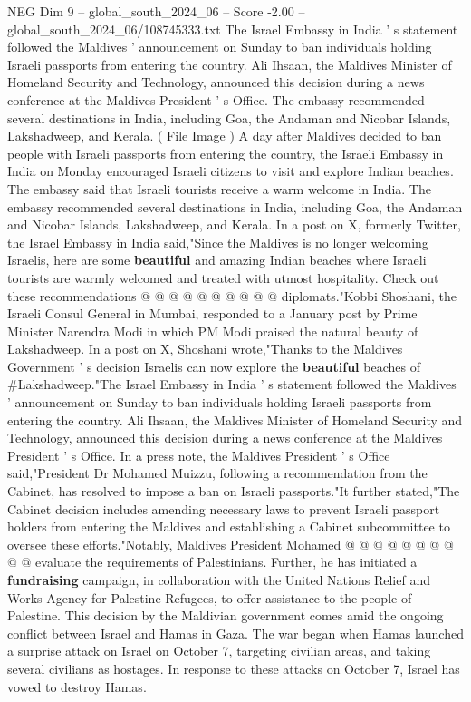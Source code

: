 \begin{textsample}{NEG Dim 9 – global\_south\_2024\_06 – Score -2.00 – global\_south\_2024\_06/108745333.txt}  \label{ex:f9_neg_396}
The Israel Embassy in India ' s statement followed the Maldives ' announcement on Sunday to ban individuals holding Israeli passports from entering the country.
Ali Ihsaan, the Maldives Minister of Homeland Security and Technology, announced this decision during a news conference at the Maldives President ' s Office.
The embassy recommended several destinations in India, including Goa, the Andaman and Nicobar Islands, Lakshadweep, and Kerala. ( File Image ) A day after Maldives decided to ban people with Israeli passports from entering the country, the Israeli Embassy in India on Monday encouraged Israeli citizens to visit and explore Indian beaches.
The embassy said that Israeli tourists receive a warm welcome in India.
The embassy recommended several destinations in India, including Goa, the Andaman and Nicobar Islands, Lakshadweep, and Kerala.
In a post on X, formerly Twitter, the Israel Embassy in India said,"Since the Maldives is no longer welcoming Israelis, here are some \textbf{beautiful} and amazing Indian beaches where Israeli tourists are warmly welcomed and treated with utmost hospitality.
Check out these recommendations @ @ @ @ @ @ @ @ @ @ diplomats."Kobbi Shoshani, the Israeli Consul General in Mumbai, responded to a January post by Prime Minister Narendra Modi in which PM Modi praised the natural beauty of Lakshadweep.
In a post on X, Shoshani wrote,"Thanks to the Maldives Government ' s decision Israelis can now explore the \textbf{beautiful} beaches of \#Lakshadweep."The Israel Embassy in India ' s statement followed the Maldives ' announcement on Sunday to ban individuals holding Israeli passports from entering the country.
Ali Ihsaan, the Maldives Minister of Homeland Security and Technology, announced this decision during a news conference at the Maldives President ' s Office.
In a press note, the Maldives President ' s Office said,"President Dr Mohamed Muizzu, following a recommendation from the Cabinet, has resolved to impose a ban on Israeli passports."It further stated,"The Cabinet decision includes amending necessary laws to prevent Israeli passport holders from entering the Maldives and establishing a Cabinet subcommittee to oversee these efforts."Notably, Maldives President Mohamed @ @ @ @ @ @ @ @ @ @ evaluate the requirements of Palestinians.
Further, he has initiated a \textbf{fundraising} campaign, in collaboration with the United Nations Relief and Works Agency for Palestine Refugees, to offer assistance to the people of Palestine.
This decision by the Maldivian government comes amid the ongoing conflict between Israel and Hamas in Gaza.
The war began when Hamas launched a surprise attack on Israel on October 7, targeting civilian areas, and taking several civilians as hostages.
In response to these attacks on October 7, Israel has vowed to destroy Hamas.

\end{textsample}
